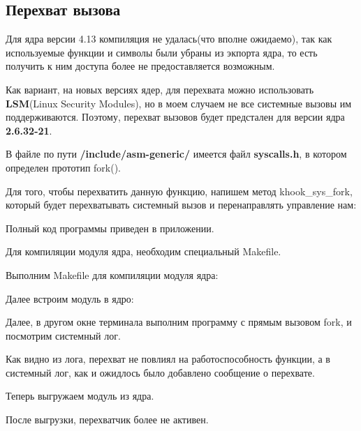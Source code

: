 \subsection{Перехват вызова}
Для ядра версии 4.13 компиляция не удалась(что вполне ожидаемо), так как используемые функции и символы были убраны из экпорта ядра, то есть получить к ним доступа более не предоставляется возможным.

Как вариант, на новых версиях ядер, для перехвата можно использовать \textbf{LSM}(Linux Security Modules), но в моем случаем не все системные вызовы им поддерживаются. Поэтому, перехват вызовов будет предстален для версии ядра \textbf{2.6.32-21}.

В файле по пути \textbf{/include/asm-generic/} имеется файл \textbf{syscalls.h}, в котором определен прототип fork().


Для того, чтобы перехватить данную функцию, напишем метод khook\_sys\_fork, который будет перехватывать системный вызов и перенаправлять управление нам:



Полный код программы приведен в приложении.  

Для компиляции модуля ядра, необходим специальный Makefile.

Выполним Makefile для компиляции модуля ядра:

Далее встроим модуль в ядро:

Далее, в другом окне терминала выполним программу с прямым вызовом fork, и посмотрим системный лог.

Как видно из лога, перехват не повлиял на работоспособность функции, а в системный лог, как и ожидлось было добавлено сообщение о перехвате. 

Теперь выгружаем модуль из ядра.

После выгрузки, перехватчик более не активен.



